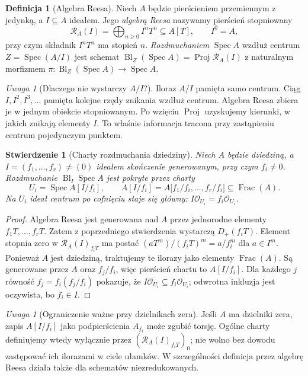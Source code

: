\documentclass[11pt,a4paper,openany]{report}
\numberwithin{equation}{section}
\theoremstyle{plain}
\newtheorem{stwierdzenie}[twierdzenie]{Stwierdzenie}
\theoremstyle{definition}
\newtheorem{definicja}[twierdzenie]{Definicja}
\theoremstyle{remark}
\newtheorem{uwaga}[twierdzenie]{Uwaga}
\newcommand{\Spec}{\operatorname{Spec}}
\newcommand{\Frac}{\operatorname{Frac}}
\begin{document}
\begin{definicja}[Algebra Reesa]
\label{def:ga5-rees}
Niech $A$ będzie pierścieniem przemiennym z jedynką,
a $I\subseteq A$ ideałem. Jego \emph{algebrą Reesa}
nazywamy pierścień stopniowany
\[
 \mathcal R_A(I)=\bigoplus_{n\ge0}I^nT^n\subseteq A[T],
 \qquad I^0=A,
\]
przy czym składnik $I^nT^n$ ma stopień $n$.
\emph{Rozdmuchaniem} $\Spec A$ wzdłuż centrum
$Z=\Spec(A/I)$ jest schemat
$\operatorname{Bl}_Z(\Spec A)=\operatorname{Proj}\mathcal R_A(I)$
z naturalnym morfizmem $\pi:\operatorname{Bl}_Z(\Spec A)\to\Spec A$.
\end{definicja}

\begin{uwaga}[Dlaczego nie wystarczy $A/I$?]
Iloraz $A/I$ pamięta samo centrum. Ciąg
$I,I^2,I^3,\ldots$ pamięta kolejne rzędy znikania
wzdłuż centrum. Algebra Reesa zbiera je w jednym
obiekcie stopniowanym. Po wzięciu $\operatorname{Proj}$
uzyskujemy kierunki, w jakich znikają elementy $I$.
To właśnie informacja tracona przy zastąpieniu
centrum pojedynczym punktem.
\end{uwaga}

\begin{stwierdzenie}[Charty rozdmuchania dziedziny]
\label{st:ga5-blowup-charts}
Niech $A$ będzie dziedziną, a
$I=(f_1,\ldots,f_r)\ne(0)$ ideałem skończenie generowanym,
przy czym $f_i\ne0$. Rozdmuchanie $\operatorname{Bl}_I\Spec A$
jest pokryte przez charty
\[
 U_i=\Spec A[I/f_i],\qquad
 A[I/f_i]=A\bigl[f_1/f_i,\ldots,f_r/f_i\bigr]\subseteq\Frac(A).
\]
Na $U_i$ ideał centrum po cofnięciu staje się główny:
$I\mathcal O_{U_i}=f_i\mathcal O_{U_i}$.
\end{stwierdzenie}
\begin{proof}
Algebra Reesa jest generowana nad $A$ przez jednorodne
elementy $f_1T,\ldots,f_rT$. Zatem z poprzedniego
stwierdzenia wystarczą $D_+(f_iT)$. Element stopnia
zero w $\mathcal R_A(I)_{f_iT}$ ma postać
$(aT^m)/(f_iT)^m=a/f_i^m$ dla $a\in I^m$.
Ponieważ $A$ jest dziedziną, traktujemy te ilorazy
jako elementy $\Frac(A)$. Są generowane przez $A$
oraz $f_j/f_i$, więc pierścień chartu to $A[I/f_i]$.
Dla każdego $j$ równość $f_j=f_i(f_j/f_i)$ pokazuje,
że $I\mathcal O_{U_i}\subseteq f_i\mathcal O_{U_i}$;
odwrotna inkluzja jest oczywista, bo $f_i\in I$.
\end{proof}

\begin{uwaga}[Ograniczenie ważne przy dzielnikach zera]
Jeśli $A$ ma dzielniki zera, zapis $A[I/f_i]$ jako
podpierścienia $A_{f_i}$ może zgubić torsję. Ogólne
charty definiujemy wtedy wyłącznie przez
$(\mathcal R_A(I)_{f_iT})_0$; nie wolno bez dowodu
zastępować ich ilorazami w ciele ułamków.
W szczególności definicja przez algebrę Reesa działa
także dla schematów niezredukowanych.
\end{uwaga}
\end{document}
